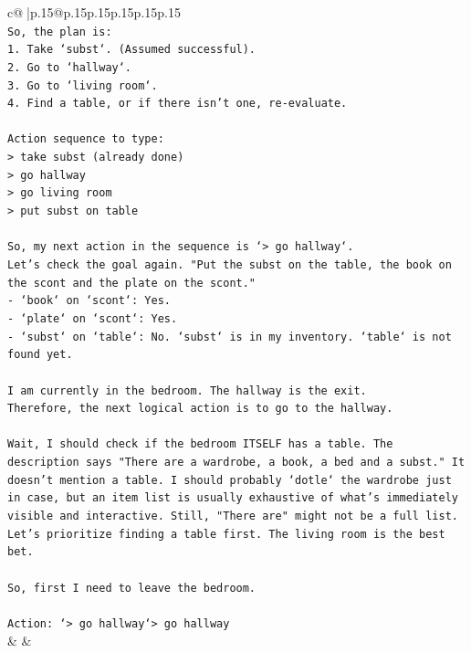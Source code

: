 \documentclass{article}
\begin{document}
{\begin{supertabular}{c@{$\;$}|p{.15\linewidth}@{}p{.15\linewidth}p{.15\linewidth}p{.15\linewidth}p{.15\linewidth}p{.15\linewidth}}
{{{\\ 
\texttt{So, the plan is:} \\
\texttt{1.  Take `subst`. (Assumed successful).} \\
\texttt{2.  Go to `hallway`.} \\
\texttt{3.  Go to `living room`.} \\
\texttt{4.  Find a table, or if there isn't one, re{-}evaluate.} \\
\\ 
\texttt{Action sequence to type:} \\
\texttt{> take subst (already done)} \\
\texttt{> go hallway} \\
\texttt{> go living room} \\
\texttt{> put subst on table} \\
\\ 
\texttt{So, my next action in the sequence is `> go hallway`.} \\
\texttt{Let's check the goal again. "Put the subst on the table, the book on the scont and the plate on the scont."} \\
\texttt{{-} `book` on `scont`: Yes.} \\
\texttt{{-} `plate` on `scont`: Yes.} \\
\texttt{{-} `subst` on `table`: No. `subst` is in my inventory. `table` is not found yet.} \\
\\ 
\texttt{I am currently in the bedroom. The hallway is the exit.} \\
\texttt{Therefore, the next logical action is to go to the hallway.} \\
\\ 
\texttt{Wait, I should check if the bedroom ITSELF has a table. The description says "There are a wardrobe, a book, a bed and a subst." It doesn't mention a table. I should probably `dotle` the wardrobe just in case, but an item list is usually exhaustive of what's immediately visible and interactive. Still, "There are" might not be a full list. Let's prioritize finding a table first. The living room is the best bet.} \\
\\ 
\texttt{So, first I need to leave the bedroom.} \\
\\ 
\texttt{Action: `> go hallway`> go hallway} \\
            }
        }
    }
    & & \\ \\


\end{supertabular}}
\end{document}
